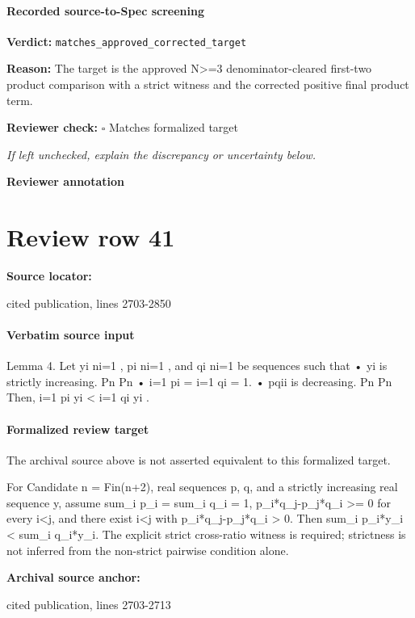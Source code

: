 \documentclass[10pt]{article}
\newcommand{\reviewerbox}{%
  \par\noindent\fbox{\parbox{0.96\linewidth}{\rule{0pt}{0.38in}}}\par
}
\newcommand{\reviewmatch}[1]{%
  \par\noindent\textbf{Reviewer check:} $\square$\; #1\par
  \noindent\emph{If left unchecked, explain the discrepancy or uncertainty below.}\par
}
\begin{document}
\paragraph{Recorded source-to-Spec screening}
\textbf{Verdict:} \texttt{matches\_approved\_corrected\_target}
\\
{\raggedright
\textbf{Reason:} The target is the approved N>=3 denominator-\allowbreak{}cleared first-\allowbreak{}two product comparison with a strict witness and the corrected positive final product term.\allowbreak{}
\par}
\reviewmatch{Matches formalized target}
\noindent\textbf{Reviewer annotation}\par
\reviewerbox
\clearpage
\hypertarget{source-claim-f5654e8ee63c4d5d}{}
\section*{Review row 41}
\textbf{Source locator:} {\footnotesize\raggedright cited publication, lines 2703-\allowbreak{}2850\par}
\paragraph{Verbatim source input}
\begin{ReviewVerbatim}
Lemma 4. Let {yi }ni=1 , {pi }ni=1 , and {qi }ni=1 be sequences such that
• yi is strictly increasing.
Pn
Pn
•
i=1 pi =
i=1 qi = 1.
• pqii is decreasing.
Pn
Pn
Then, i=1 pi yi < i=1 qi yi .
\end{ReviewVerbatim}


\paragraph{Formalized review target}
The archival source above is not asserted equivalent to this formalized target.
\begin{ReviewVerbatim}
For Candidate n = Fin(n+2), real sequences p, q, and a strictly increasing real sequence y, assume sum_i p_i = sum_i q_i = 1, p_i*q_j-p_j*q_i >= 0 for every i<j, and there exist i<j with p_i*q_j-p_j*q_i > 0. Then sum_i p_i*y_i < sum_i q_i*y_i. The explicit strict cross-ratio witness is required; strictness is not inferred from the non-strict pairwise condition alone.
\end{ReviewVerbatim}

\textbf{Archival source anchor:} {\footnotesize\raggedright cited publication, lines 2703-\allowbreak{}2713\par}
\end{document}
